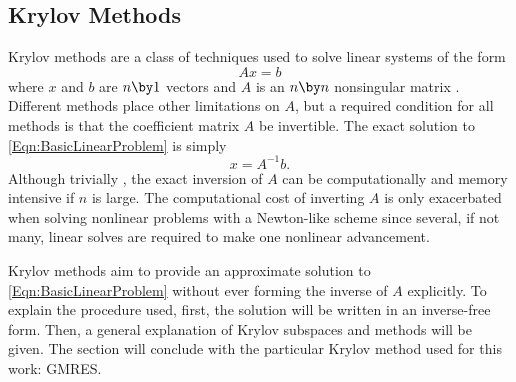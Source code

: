 \subsection{Krylov Methods}
Krylov methods are a class of techniques used to solve linear systems of the form
\begin{equation}
    A x = b
    \label{Eqn:BasicLinearProblem}
\end{equation}
where $x$ and $b$ are $n \by 1$ vectors and $A$ is an $n \by n$ nonsingular matrix \cite{saad_iterative_2003}.
Different methods place other limitations on $A$, but a required condition for all methods is that the coefficient matrix $A$ be invertible.
The exact solution to \cref{Eqn:BasicLinearProblem} is simply
\begin{equation}
    x = A^{-1} b.
    \label{Eqn:BasicLinearSolution}
\end{equation}
Although trivially , the exact inversion of $A$ can be computationally and memory intensive if $n$ is large.
The computational cost of inverting $A$ is only exacerbated when solving nonlinear problems with a Newton-like scheme since several, if not many, linear solves are required to make one nonlinear advancement.

Krylov methods aim to provide an approximate solution to \cref{Eqn:BasicLinearProblem} without ever forming the inverse of $A$ explicitly.
To explain the procedure used, first, the solution will be written in an inverse-free form.
Then, a general explanation of Krylov subspaces and methods will be given.
The section will conclude with the particular Krylov method used for this work: GMRES.



